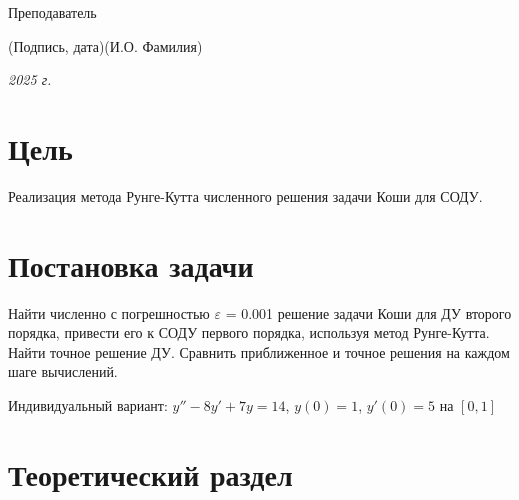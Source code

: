 \documentclass[14pt, russian]{scrartcl}
\begin{document}
\begin{titlepage}
	\bigskip

	\noindent Преподаватель  \hfill \underline{\hspace{4cm}}\quad

	\vspace{-2ex}
	\noindent\hspace{13.5ex}\normalsize\hspace{170pt}\hspace{2ex}\scriptsize{(Подпись, дата)}\normalsize\hspace{30pt}\hspace{6ex}\scriptsize{(И.О. Фамилия)}\normalsize

	\bigskip




	\begin{center}
		\textsl{2025 г.}
	\end{center}
\end{titlepage}


\setlength{\tabcolsep}{3pt}
\newpage
\setcounter{page}{2}

\newpage
\section{Цель}

Реализация метода Рунге-Кутта численного решения задачи Коши для СОДУ.

\section{Постановка задачи}

Найти численно с погрешностью $\varepsilon$ = 0.001 решение задачи Коши для ДУ второго
порядка, привести его к СОДУ первого порядка, используя метод Рунге-Кутта. Найти
точное решение ДУ. Сравнить приближенное и точное решения на каждом шаге
вычислений.

Индивидуальный вариант: $y'' - 8y' + 7y = 14$, $y(0) = 1$, $y'(0) = 5$ на $[0, 1]$

\section{Теоретический раздел}
\end{document}
